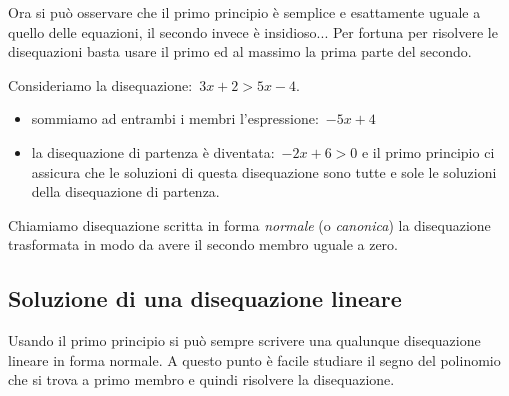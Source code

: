 Ora si può osservare che il primo principio è semplice e esattamente uguale a
quello delle equazioni, il secondo invece è insidioso...
Per fortuna per risolvere le disequazioni basta usare il primo ed al massimo
la prima parte del secondo.

 \begin{esempio}
Consideriamo la disequazione:~$3x + 2 > 5 x -4$.
\begin{itemize} [noitemsep]
 \item sommiamo ad entrambi i membri l'espressione:~$-5 x +4$
 \item la disequazione di partenza è diventata:~$-2 x +6 > 0$ e
  il primo principio ci assicura che le soluzioni di questa disequazione sono
  tutte e sole le soluzioni della disequazione di partenza.
\end{itemize}
 \end{esempio}

Chiamiamo disequazione scritta in forma \emph{normale} (o \emph{canonica})
la disequazione trasformata in modo da avere il secondo membro uguale a zero.

\subsection{Soluzione di una disequazione lineare}

Usando il primo principio si può sempre scrivere una qualunque disequazione
lineare in forma normale. A questo punto è facile studiare il segno del
polinomio che si trova a primo membro e quindi risolvere la disequazione.

